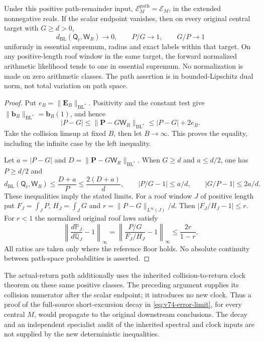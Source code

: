 \begin{theorem}
\label{thm:v74-path}
Under this positive path-remainder input,
$\mathcal E_M^{\mathrm{path}}=\mathcal E_M$, in the extended
nonnegative reals. If the scalar endpoint vanishes, then on every
original central target with $G\ge d>0$,
\[
 d_{\mathrm{BL}}(\mathsf Q_t,\mathsf W_R)\longrightarrow0,
 \qquad P/G\longrightarrow1,\qquad G/P\longrightarrow1
\]
uniformly in essential supremum, radius and exact labels within
that target. On any positive-length roof window in the same target,
the forward normalized arithmetic likelihood tends to one in
essential supremum. No normalization is made on zero arithmetic
classes. The path assertion is in bounded-Lipschitz dual norm,
not total variation on path space.
\end{theorem}
\begin{proof}
Put $e_B=\|\mathbf E_B\|_{\mathrm{BL}^*}$. Positivity and the
constant test give $\|\mathbf b_B\|_{\mathrm{BL}^*}=\mathbf b_B(1)$,
and hence
\[
 |P-G|\le\|\mathbf P-G\mathsf W_R\|_{\mathrm{BL}^*}
                                      \le |P-G|+2e_B.
\]
Take the collision limsup at fixed $B$, then let $B\to\infty$.
This proves the equality, including the infinite case by the
left inequality.

Let $a=|P-G|$ and $D=\|\mathbf P-G\mathsf W_R\|_{\mathrm{BL}^*}$.
When $G\ge d$ and $a\le d/2$, one has $P\ge d/2$ and
\[
 d_{\mathrm{BL}}(\mathsf Q_t,\mathsf W_R)\le\frac{D+a}{P}
       \le\frac{2(D+a)}d,\qquad
 |P/G-1|\le a/d,\qquad |G/P-1|\le2a/d.
\]
These inequalities imply the stated limits. For a roof window $J$
of positive length put $F_J=\int_J P$, $H_J=\int_J G$ and
$r=\|P-G\|_{L^\infty(J)}/d$. Then
$|F_J/H_J-1|\le r$. For $r<1$ the normalized original roof laws
satisfy
\[
 \left\|\frac{d\mathbb P_J}{d\mathbb Q_J}-1\right\|_\infty
   =\left\|\frac{P/G}{F_J/H_J}-1\right\|_\infty
                                      \le\frac{2r}{1-r}.
\]
All ratios are taken only where the reference floor holds. No
absolute continuity between path-space probabilities is asserted.
\end{proof}

The actual-return path additionally uses the inherited
collision-to-return clock theorem on these same positive classes.
The preceding argument supplies its collision numerator after the
scalar endpoint; it introduces no new clock. Thus a proof of the
full-source short-excursion decay in
\eqref{eq:v74-error-limit}, for every central $M$, would propagate
to the original downstream conclusions. The decay and an independent
specialist audit of the inherited spectral and clock inputs are not
supplied by the new deterministic inequalities.
